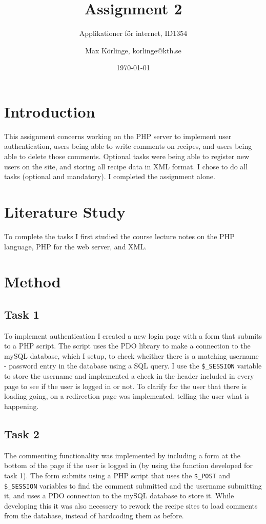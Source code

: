 \documentclass[a4paper]{scrreprt}
\title{Assignment 2}
\subtitle{Applikationer för internet, ID1354}
\author{Max Körlinge, korlinge@kth.se}
\date{\today}
\newcommand{\code}[1]{\texttt{#1}}
\begin{document}
\maketitle

\tableofcontents %
\clearpage

\chapter{Introduction}

This assignment concerns working on the PHP server to implement user authentication, users being able to write comments on recipes, and users being able to delete those comments. Optional tasks were being able to register new users on the site, and storing all recipe data in XML format. I chose to do all tasks (optional and mandatory). I completed the assignment alone.

\chapter{Literature Study}

To complete the tasks I first studied the course lecture notes on the PHP language, PHP for the web server, and XML.

\chapter{Method}

\section{Task 1}

To implement authentication I created a new login page with a form that submits to a PHP script. The script uses the PDO library to make a connection to the mySQL database, which I setup, to check wheither there is a matching username - password entry in the database using a SQL query. I use the \code{\$\_SESSION} variable to store the username and implemented a check in the header included in every page to see if the user is logged in or not. To clarify for the user that there is loading going, on a redirection page was implemented, telling the user what is happening.

\section{Task 2}

The commenting functionality was implemented by including a form at the bottom of the page if the user is logged in (by using the function developed for task 1). The form submits using a PHP script that uses the \code{\$\_POST} and \code{\$\_SESSION} variables to find the comment submitted and the username submitting it, and uses a PDO connection to the mySQL database to store it. While developing this it was also necessery to rework the recipe sites to load comments from the database, instead of hardcoding them as before.
\end{document}
